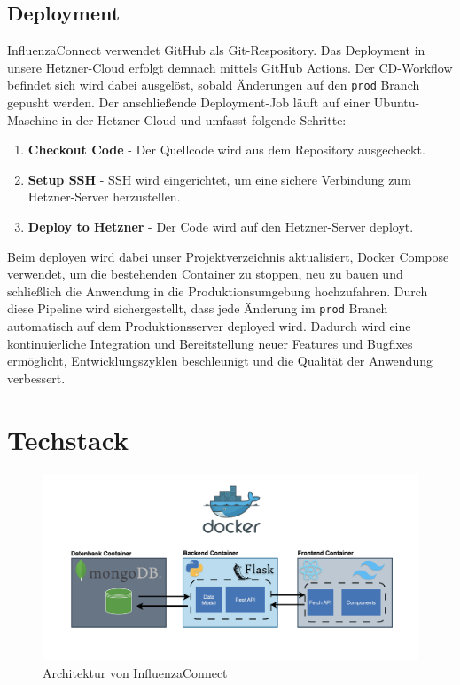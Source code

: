 \documentclass[conference,a4paper,flushend]{cs-techrep}
\begin{document}
\subsection{Deployment}
InfluenzaConnect verwendet GitHub als Git-Respository. Das Deployment in unsere Hetzner-Cloud erfolgt demnach mittels GitHub Actions. Der CD-Workflow befindet sich wird dabei ausgelöst, sobald Änderungen auf den \texttt{prod} Branch gepusht werden. Der anschließende Deployment-Job läuft auf einer Ubuntu-Maschine in der Hetzner-Cloud und umfasst folgende Schritte:
\begin{enumerate}
\item{\textbf{Checkout Code} - Der Quellcode wird aus dem Repository ausgecheckt.}
\item{\textbf{Setup SSH} - SSH wird eingerichtet, um eine sichere Verbindung zum Hetzner-Server
herzustellen.}
\item{\textbf{Deploy to Hetzner} - Der Code wird auf den Hetzner-Server deployt.}
\end{enumerate}
Beim deployen wird dabei unser Projektverzeichnis aktualisiert, Docker Compose verwendet, um die bestehenden Container zu stoppen, neu zu bauen und schließlich die Anwendung in die Produktionsumgebung hochzufahren.
Durch diese Pipeline wird sichergestellt, dass jede Änderung im \texttt{prod} Branch automatisch auf dem Produktionsserver deployed wird. Dadurch wird eine kontinuierliche Integration und Bereitstellung neuer Features und Bugfixes ermöglicht, Entwicklungszyklen beschleunigt und die Qualität der Anwendung verbessert.


\section{Techstack}

\begin{figure}[h]
	\centering
	\includegraphics[width=\linewidth]{../Bilder/Architektur.png}
	\caption{Architektur von InfluenzaConnect}
	\label{fig:Architektur}
\end{figure}
\end{document}

